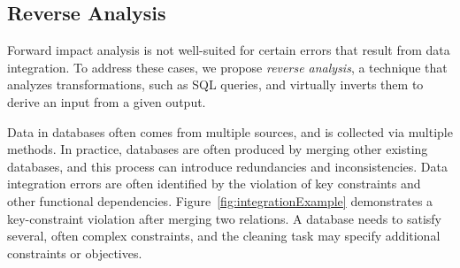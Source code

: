 


\subsection{Reverse Analysis} %
\label{sub:reverse_analysis}
Forward impact analysis is not well-suited for certain errors that
result from data integration. To address these cases, we propose \emph{reverse analysis}, a technique that analyzes transformations, such as SQL queries, and virtually inverts them to derive an input from a given output.

Data in databases often comes from multiple
sources, and is collected via multiple methods. In practice, databases are
often produced by merging other existing databases, and this process can
introduce redundancies and inconsistencies. Data integration errors are often identified by the violation of key constraints and other functional dependencies. Figure~\ref{fig:integrationExample} demonstrates a key-constraint violation after merging two relations. A database needs to satisfy several, often complex constraints, and the cleaning task may specify additional constraints or objectives.

